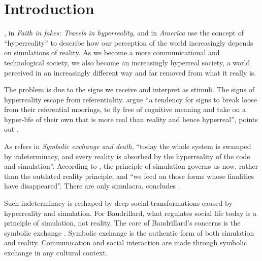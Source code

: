 \documentclass[english]{textolivre}
\begin{document}
\begin{polyabstract}
\begin{portuguese}
\begin{abstract}
\end{abstract}
\end{portuguese}
\end{polyabstract}

\section{Introduction}

\textcite{eco_faith_1998}, in \textit{Faith in fakes: Travels in hyperreality}, and \textcite{baudrillard_america_1989} in \textit{America} use the concept of “hyperreality” to describe how our perception of the world increasingly depends on simulations of reality. As we become a more communicational and technological society, we also become an increasingly hyperreal society, a world perceived in an increasingly different way and far removed from what it really is.

The problem is due to the signs we receive and interpret as stimuli. The signs of hyperreality escape from referentiality. \textcite{eco_faith_1998,baudrillard_america_1989} argue “a tendency for signs to break loose from their referential moorings, to fly free of cognitive meaning and take on a hyper-life of their own that is more real than reality and hence hyperreal”, points out \textcite[p.~41]{tiffin_hyperreality_2005}.

As \textcite[p.~2]{baudrillard_symbolic_2000} refers in \textit{Symbolic exchange and death}, “today the whole system is swamped by indeterminacy, and every reality is absorbed by the hyperreality of the code and simulation”. According to \textcite[p.~2]{baudrillard_symbolic_2000}, the principle of simulation governs us now, rather than the outdated reality principle, and “we feed on those forms whose finalities have disappeared”. There are only simulacra, concludes \textcite{baudrillard_symbolic_2000}.

Such indeterminacy is reshaped by deep social transformations caused by hyperreality and simulation. For Baudrillard, what regulates social life today is a principle of simulation, not reality. The core of Baudrillard’s concerns is the symbolic exchange \cite[p.~36-37]{smith_baudrillard_2010}. Symbolic exchange is the authentic form of both simulation and reality. Communication and social interaction are made through symbolic exchange in any cultural context.
\end{document}

